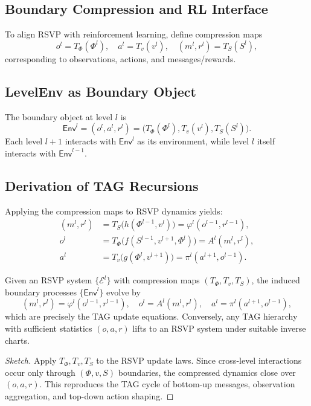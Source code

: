 \documentclass[11pt,a4paper]{article}
\begin{document}
\subsection{Boundary Compression and RL Interface}
To align RSVP with reinforcement learning, define compression maps
\[
o^l = T_\Phi(\Phi^l), \quad a^l = T_v(v^l), \quad (m^l, r^l) = T_S(S^l),
\]
corresponding to observations, actions, and messages/rewards.

\subsection{LevelEnv as Boundary Object}
\begin{definition}
The boundary object at level $l$ is
\[
\mathsf{Env}^l = (o^l, a^l, r^l) = \big(T_\Phi(\Phi^l), T_v(v^l), T_S(S^l)\big).
\]
Each level $l+1$ interacts with $\mathsf{Env}^l$ as its environment, while level $l$ itself interacts with $\mathsf{Env}^{l-1}$.
\end{definition}

\subsection{Derivation of TAG Recursions}
Applying the compression maps to RSVP dynamics yields:
\begin{align}
(m^l, r^l) &= T_S\!\big(h(\Phi^{l-1}, v^l)\big) 
          = \varphi^l(o^{l-1}, r^{l-1}), \\
o^l        &= T_\Phi\!\big(f(S^{l-1}, v^{l+1}, \Phi^l)\big) 
          = A^l(m^l, r^l), \\
a^l        &= T_v\!\big(g(\Phi^l, v^{l+1})\big) 
          = \pi^l(a^{l+1}, o^{l-1}).
\end{align}

\begin{theorem}
Given an RSVP system $\{\mathcal{E}^l\}$ with compression maps $(T_\Phi,T_v,T_S)$,
the induced boundary processes $\{\mathsf{Env}^l\}$ evolve by
\[
(m^l, r^l) = \varphi^l(o^{l-1}, r^{l-1}), \quad
o^l = A^l(m^l, r^l), \quad
a^l = \pi^l(a^{l+1}, o^{l-1}),
\]
which are precisely the TAG update equations. Conversely, any TAG hierarchy with sufficient statistics $(o,a,r)$ lifts to an RSVP system under suitable inverse charts.
\end{theorem}

\begin{proof}[Sketch]
Apply $T_\Phi,T_v,T_S$ to the RSVP update laws. Since cross-level interactions occur only through $(\Phi,v,S)$ boundaries, the compressed dynamics close over $(o,a,r)$. This reproduces the TAG cycle of bottom-up messages, observation aggregation, and top-down action shaping.
\end{proof}
\end{document}
